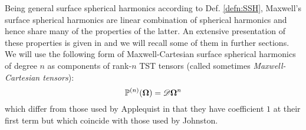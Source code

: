 Being general surface spherical harmonics according to Def. \ref{defn:SSH}, Maxwell's surface spherical harmonics are
linear combination of spherical harmonics and hence share many of the properties of the latter. An extensive presentation
of these properties is given in \cite{Applequist1,Applequist2} and we will recall some of them in further sections. We
will use the following form of Maxwell-Cartesian surface spherical harmonics of degree $n$ as components of rank-$n$ TST
tensors (called sometimes \textit{Maxwell-Cartesian tensors}):
\begin{equation}\label{eq:MCSH}
  \mathbb{P}^{(n)}(\mathbf{\Omega}) = \mathscr{D} \mathbf{\Omega}^n
\end{equation}
which differ from those used by Applequist in that they have coefficient $1$ at their first term but which coincide 
with those used by Johnston. 
 
